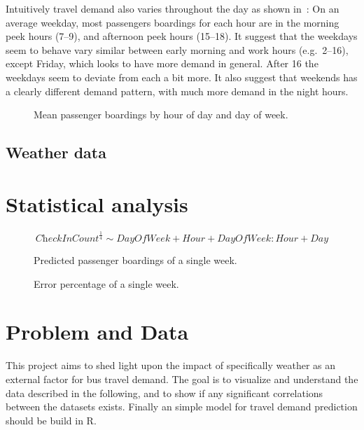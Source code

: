 \documentclass[a4paper,11pt]{article}
\begin{document}
Intuitively travel demand also varies throughout the day as shown in~: On an average weekday, most passengers boardings for each hour are in the morning peek hours (7--9), and afternoon peek hours (15--18). It suggest that the weekdays seem to behave vary similar between early morning and work hours (e.g.\ 2--16), except Friday, which looks to have more demand in general. After 16 the weekdays seem to deviate from each a bit more. It also suggest that weekends has a clearly different demand pattern, with much more demand in the night hours.

\begin{figure}[!ht]
    \center
    
    \caption{Mean passenger boardings by hour of day and day of week.}
    \label{fig:travelcard_hist}
\end{figure}
\clearpage

\subsection{Weather data}\label{ch:desc_weather}

\clearpage

\section{Statistical analysis}

$$
\textit{CheckInCount}^{\frac{1}{4}} \sim \textit{DayOfWeek} + \textit{Hour} + \textit{DayOfWeek}:\textit{Hour} + \textit{Day}
$$

\begin{figure}[!ht]
    \center
    
    \caption{Predicted passenger boardings of a single week.}
    \label{fig:travelcard_pred}
\end{figure}

\begin{figure}[!ht]
    \center
    
    \caption{Error percentage of a single week.}
    \label{fig:travelcard_error_pct}
\end{figure}

\clearpage

\section{Problem and Data}\label{ch:data_old}
This project aims to shed light upon the impact of specifically weather as an external factor for bus travel demand. The goal is to visualize and understand the data described in the following, and to show if any significant correlations between the datasets exists. Finally an simple model for travel demand prediction should be build in R.
\end{document}
